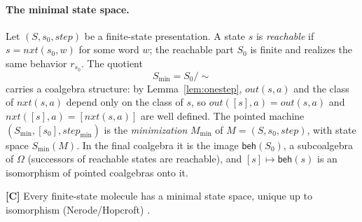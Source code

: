 \paragraph{The minimal state space.}
Let $(S, s_0, \mathit{step})$ be a finite-state presentation. A state $s$ is
\emph{reachable} if $s = \mathit{nxt} (s_0, w)$ for some word $w$; the reachable part
$S_0$ is finite and realizes the same behavior $r_{s_0}$. The quotient
\[
S_{\min} = S_0/{\sim}
\]
carries a coalgebra structure: by Lemma~\ref{lem:onestep}, $\mathit{out} (s,a)$ and the
class of $\mathit{nxt} (s,a)$ depend only on the class of $s$, so
$\mathit{out} ([s], a) = \mathit{out} (s,a)$ and
$\mathit{nxt} ([s], a) = [\mathit{nxt} (s,a)]$ are well defined. The pointed machine
$(S_{\min}, [s_0], \mathit{step}_{\min})$ is the \emph{minimization} $M_{\min}$ of
$M = (S, s_0, \mathit{step})$, with state space $S_{\min} (M)$. In the final coalgebra
it is the image $\mathsf{beh} (S_0)$, a subcoalgebra of $\Omega$ (successors of
reachable states are reachable), and $[s] \mapsto \mathsf{beh} (s)$ is an isomorphism of
pointed coalgebras onto it.

\begin{theorem}\label{thm:38}
\textbf{[C]} Every finite-state molecule has a minimal state space, unique up to
isomorphism (Nerode/Hopcroft) \citep{nerode,hopcroft}.
\end{theorem}


